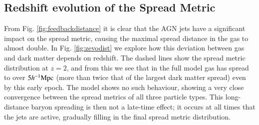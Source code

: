 \subsection{Redshift evolution of the Spread Metric}


From Fig. \ref{fig:feedbackdistance} it is clear that the AGN jets have a
significant impact on the spread metric, causing the maximal spread distance
in the gas to almost double. In Fig. \ref{fig:zevodist} we explore how this
deviation between gas and dark matter depends on redshift. The dashed lines
show the spread metric distribution at $z=2$, and from this we see that in
the full model gas has spread to over $5h^{-1}{\rm Mpc}{}$ (more than twice that of the
largest dark matter spread) even by this early epoch. The \nojet{} model
shows no such behaviour, showing a very close convergence between the spread
metrics of all three particle types. This long-distance baryon spreading is
then not a late-time effect; it occurs at all times that the jets are active,
gradually filling in the final spread metric distribution.